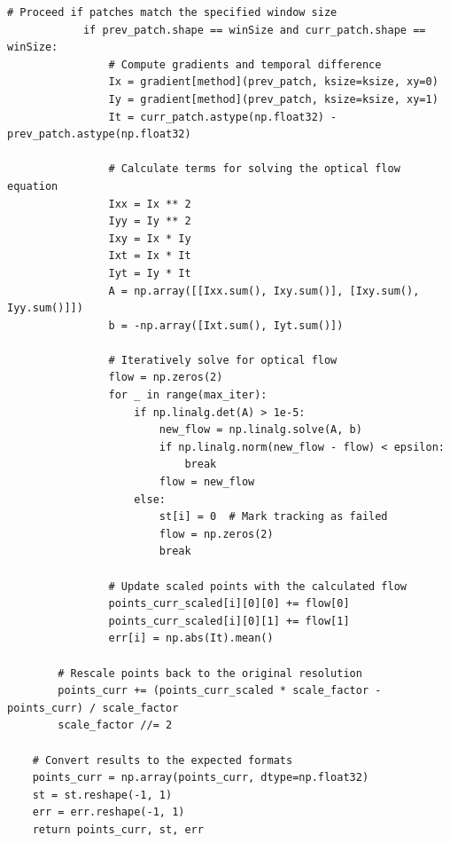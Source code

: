 \documentclass[11pt, conference, letterpaper]{IEEEtran}
\begin{document}
\begin{lstlisting}[style=python, caption={\texttt{calcOpticalFlowPyrLK\_numpy}}, label={lst:calcOpticalFlowPyrLK}]
            # Proceed if patches match the specified window size
            if prev_patch.shape == winSize and curr_patch.shape == winSize:
                # Compute gradients and temporal difference
                Ix = gradient[method](prev_patch, ksize=ksize, xy=0)
                Iy = gradient[method](prev_patch, ksize=ksize, xy=1)
                It = curr_patch.astype(np.float32) - prev_patch.astype(np.float32)

                # Calculate terms for solving the optical flow equation
                Ixx = Ix ** 2
                Iyy = Iy ** 2
                Ixy = Ix * Iy
                Ixt = Ix * It
                Iyt = Iy * It
                A = np.array([[Ixx.sum(), Ixy.sum()], [Ixy.sum(), Iyy.sum()]])
                b = -np.array([Ixt.sum(), Iyt.sum()])

                # Iteratively solve for optical flow
                flow = np.zeros(2)
                for _ in range(max_iter):
                    if np.linalg.det(A) > 1e-5:
                        new_flow = np.linalg.solve(A, b)
                        if np.linalg.norm(new_flow - flow) < epsilon:
                            break
                        flow = new_flow
                    else:
                        st[i] = 0  # Mark tracking as failed
                        flow = np.zeros(2)
                        break

                # Update scaled points with the calculated flow
                points_curr_scaled[i][0][0] += flow[0]
                points_curr_scaled[i][0][1] += flow[1]
                err[i] = np.abs(It).mean()

        # Rescale points back to the original resolution
        points_curr += (points_curr_scaled * scale_factor - points_curr) / scale_factor
        scale_factor //= 2

    # Convert results to the expected formats
    points_curr = np.array(points_curr, dtype=np.float32)
    st = st.reshape(-1, 1)
    err = err.reshape(-1, 1)
    return points_curr, st, err
\end{lstlisting}
\end{document}
